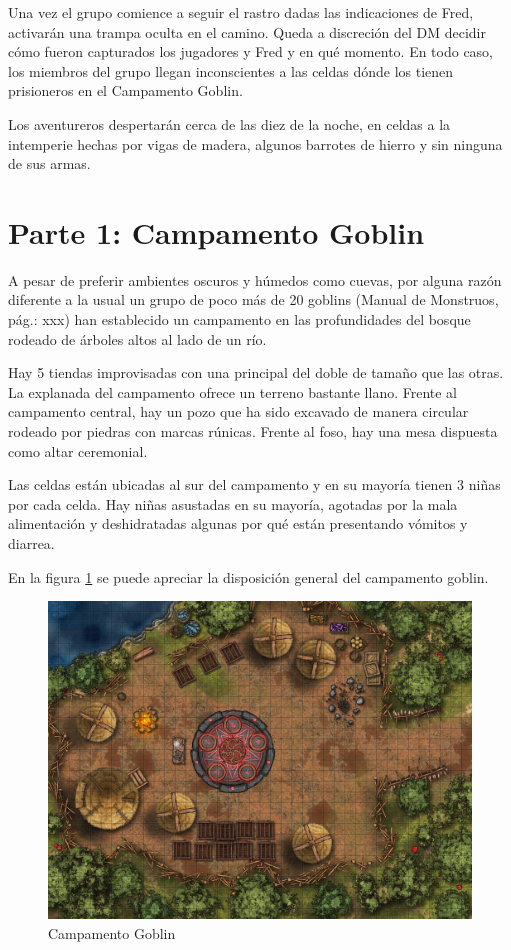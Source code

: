 \documentclass[10pt,twoside,twocolumn,openany]{dndbook}
\begin{document}
Una vez el grupo comience a seguir el rastro dadas las indicaciones de Fred, activarán una trampa
oculta en el camino. Queda a discreción del DM decidir cómo fueron capturados los jugadores y
Fred y en qué momento. En todo caso, los miembros del grupo llegan inconscientes a las celdas 
dónde los tienen prisioneros en el Campamento Goblin.

Los aventureros despertarán cerca de las diez de la noche, en celdas a la intemperie hechas por vigas de 
madera, algunos barrotes de hierro y sin ninguna de sus armas.


\section{Parte 1: Campamento Goblin}

A pesar de preferir ambientes oscuros y húmedos como cuevas, por alguna razón diferente a la usual 
un grupo de poco más de 20 goblins (Manual de Monstruos, pág.: xxx) han establecido un campamento 
en las profundidades del bosque rodeado de árboles altos al lado de un río. 

Hay 5 tiendas improvisadas con una principal del doble de tamaño que las otras. La explanada del 
campamento ofrece un terreno bastante llano. Frente al campamento central, hay un pozo que ha sido 
excavado de manera circular rodeado por piedras con marcas rúnicas. Frente al foso, hay una mesa 
dispuesta como altar ceremonial.

Las celdas están ubicadas al sur del campamento y en su mayoría tienen 3 niñas por cada celda. Hay 
niñas asustadas en su mayoría, agotadas por la mala alimentación y deshidratadas algunas por qué 
están presentando vómitos y diarrea.

En la figura \ref{fig:camp1} se puede apreciar la disposición general del campamento goblin.

\begin{figure}[hb!]
  \centering
  \includegraphics[width=\textwidth]{maps/goblin-camp.jpg}
  \caption{Campamento Goblin}
  \label{fig:camp1}
\end{figure}
\end{document}
